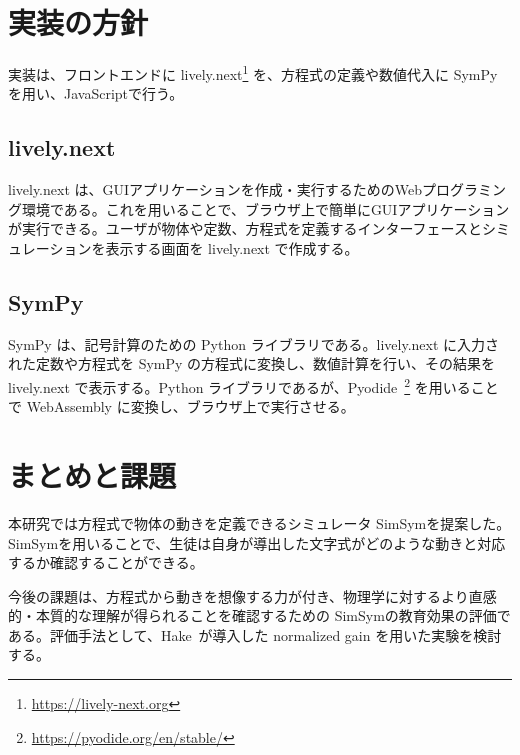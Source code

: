 \documentclass[11pt, a4paper, oneside, twocolumn, dvipdfmx]{jsarticle}
\newcommand{\simname}{SimSym}
\begin{document}
\section{実装の方針} \label{sec3}
実装は、フロントエンドに lively.next\footnote{\url{https://lively-next.org}} を、方程式の定義や数値代入に SymPy~\cite{meurer_sympy_2017} を用い、JavaScriptで行う。

\subsection*{lively.next}
lively.next は、GUIアプリケーションを作成・実行するためのWebプログラミング環境である。これを用いることで、ブラウザ上で簡単にGUIアプリケーションが実行できる。ユーザが物体や定数、方程式を定義するインターフェースとシミュレーションを表示する画面を lively.next で作成する。

\subsection*{SymPy}
SymPy は、記号計算のための Python ライブラリである。lively.next に入力された定数や方程式を SymPy の方程式に変換し、数値計算を行い、その結果を lively.next で表示する。Python ライブラリであるが、Pyodide~\footnote{\url{https://pyodide.org/en/stable/}} を用いることで WebAssembly に変換し、ブラウザ上で実行させる。


\section{まとめと課題}
本研究では方程式で物体の動きを定義できるシミュレータ \simname を提案した。\simname を用いることで、生徒は自身が導出した文字式がどのような動きと対応するか確認することができる。

今後の課題は、方程式から動きを想像する力が付き、物理学に対するより直感的・本質的な理解が得られることを確認するための \simname の教育効果の評価である。評価手法として、Hake~\cite{hake_1998}が導入した normalized gain を用いた実験を検討する。



\end{document}
